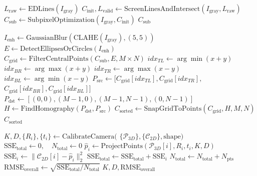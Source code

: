 \begin{algorithm}[t]
\caption{Camera Calibration Pipeline}
\label{alg:calibration_pipeline}
\begin{algorithmic}[1]
\footnotesize

    \State $L_{\text{raw}} \gets \text{EDLines}(I_{\text{gray}})$
    \State $C_{\text{init}}, L_{\text{valid}} \gets \text{ScreenLinesAndIntersect}(I_{\text{gray}}, L_{\text{raw}})$
    \State $C_{\text{sub}} \gets \text{SubpixelOptimization}(I_{\text{gray}}, C_{\text{init}})$
    \State \Return $C_{\text{sub}}$
\EndFunction

\Statex

    \State $I_{\text{enh}} \gets \text{GaussianBlur}(\text{CLAHE}(I_{\text{gray}}), (5,5))$
    \State $E \gets \text{DetectEllipsesOrCircles}(I_{\text{enh}})$
    \State $C_{\text{grid}} \gets \text{FilterCentralPoints}(C_{\text{sub}}, E, M \times N)$
    \State $idx_{TL} \gets \arg\min(x+y)$
    \State $idx_{BR} \gets \arg\max(x+y)$
    \State $idx_{TR} \gets \arg\max(x-y)$
    \State $idx_{BL} \gets \arg\min(x-y)$
    \State $P_{\text{src}} \gets [C_{\text{grid}}[idx_{TL}], C_{\text{grid}}[idx_{TR}],$
    \Statex \hspace{3.5em} $C_{\text{grid}}[idx_{BR}], C_{\text{grid}}[idx_{BL}]]$
    \State $P_{\text{dst}} \gets [(0,0), (M-1,0), (M-1,N-1), (0,N-1)]$
    \State $H \gets \text{FindHomography}(P_{\text{dst}}, P_{\text{src}})$
    \State $C_{\text{sorted}} \gets \text{SnapGridToPoints}(C_{\text{grid}}, H, M, N)$
    \State \Return $C_{\text{sorted}}$
\EndFunction

\Statex

    \State $K, D, \{R_i\}, \{t_i\} \gets \text{CalibrateCamera}($
    \Statex \hspace{4em} $\{\mathcal{P}_{3D}\}, \{\mathcal{C}_{2D}\}, \text{shape})$
    \State $\text{SSE}_{\text{total}} \gets 0, \quad N_{\text{total}} \gets 0$
        \State $\hat{p}_i \gets \text{ProjectPoints}(\mathcal{P}_{3D}[i], R_i, t_i, K, D)$
        \State $\text{SSE}_i \gets \|\mathcal{C}_{2D}[i] - \hat{p}_i\|_2^2$
        \State $\text{SSE}_{\text{total}} \gets \text{SSE}_{\text{total}} + \text{SSE}_i$
        \State $N_{\text{total}} \gets N_{\text{total}} + N_{\text{pts}}$
    \EndFor
    \State $\text{RMSE}_{\text{overall}} \gets \sqrt{\text{SSE}_{\text{total}} / N_{\text{total}}}$
    \State \Return $K, D, \text{RMSE}_{\text{overall}}$
\EndFunction


\end{algorithmic}
\end{algorithm}

